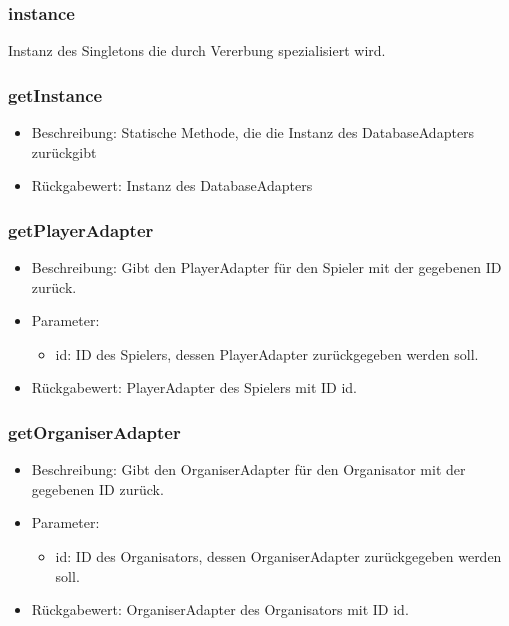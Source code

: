 \documentclass[a4paper]{scrreprt}
\begin{document}
	\subsubsection{instance}
	Instanz des Singletons die durch Vererbung spezialisiert wird.
	
	\subsubsection{getInstance}
	\begin{itemize}
		\item Beschreibung: Statische Methode, die die Instanz des DatabaseAdapters zurückgibt
		\item Rückgabewert: Instanz des DatabaseAdapters
	\end{itemize}
	
	\subsubsection{getPlayerAdapter}
	\begin{itemize}
		\item Beschreibung: Gibt den PlayerAdapter für den Spieler mit der gegebenen ID zurück.
		\item Parameter:
		\begin{itemize}
			\item id: ID des Spielers, dessen PlayerAdapter zurückgegeben werden soll.
		\end{itemize}
		\item Rückgabewert: PlayerAdapter des Spielers mit ID id.
	\end{itemize}
	
	\subsubsection{getOrganiserAdapter}
	\begin{itemize}
		\item Beschreibung: Gibt den OrganiserAdapter für den Organisator mit der gegebenen ID zurück.
		\item Parameter:
		\begin{itemize}
			\item id: ID des Organisators, dessen OrganiserAdapter zurückgegeben werden soll.
		\end{itemize}
		\item Rückgabewert: OrganiserAdapter des Organisators mit ID id.
	\end{itemize}
	
\end{document}

